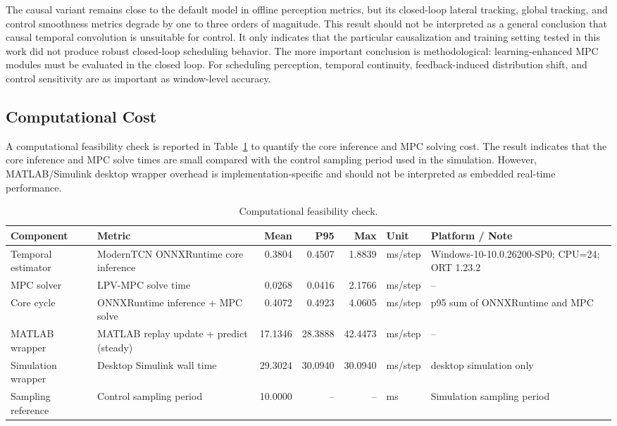 \documentclass{ieeeaccess}
\begin{document}
The causal variant remains close to the default model in offline perception metrics, but its closed-loop lateral tracking, global tracking, and control smoothness metrics degrade by one to three orders of magnitude. This result should not be interpreted as a general conclusion that causal temporal convolution is unsuitable for control. It only indicates that the particular causalization and training setting tested in this work did not produce robust closed-loop scheduling behavior. The more important conclusion is methodological: learning-enhanced MPC modules must be evaluated in the closed loop. For scheduling perception, temporal continuity, feedback-induced distribution shift, and control sensitivity are as important as window-level accuracy.



\subsection{Computational Cost}



A computational feasibility check is reported in Table~\ref{tab:realtime} to quantify the core inference and MPC solving cost. The result indicates that the core inference and MPC solve times are small compared with the control sampling period used in the simulation. However, MATLAB/Simulink desktop wrapper overhead is implementation-specific and should not be interpreted as embedded real-time performance.

\begin{table}[!t]
\centering
\caption{Computational feasibility check.}
\label{tab:realtime}
\footnotesize
\begin{tabular}{@{}p{}p{}rrrp{}p{}@{}}
\hline
Component & Metric & Mean & P95 & Max & Unit & Platform / Note \\
\hline
Temporal estimator & ModernTCN ONNXRuntime core inference & 0.3804 & 0.4507 & 1.8839 & ms/step & Windows-10-10.0.26200-SP0; CPU=24; ORT 1.23.2 \\
MPC solver & LPV-MPC solve time & 0.0268 & 0.0416 & 2.1766 & ms/step & -- \\
Core cycle & ONNXRuntime inference + MPC solve & 0.4072 & 0.4923 & 4.0605 & ms/step & p95 sum of ONNXRuntime and MPC \\
MATLAB wrapper & MATLAB replay update + predict (steady) & 17.1346 & 28.3888 & 42.4473 & ms/step & -- \\
Simulation wrapper & Desktop Simulink wall time & 29.3024 & 30.0940 & 30.0940 & ms/step & desktop simulation only \\
Sampling reference & Control sampling period & 10.0000 & -- & -- & ms & Simulation sampling period \\
\hline
\end{tabular}
\end{table}
\FloatBarrier
\end{document}

